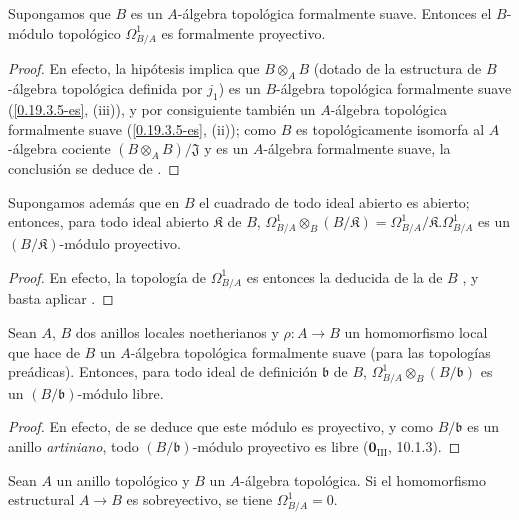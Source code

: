 \begin{theorem}[20.4.9]
\label{0.20.4.9-fr}
Supongamos que $B$ es un $A$-álgebra topológica formalmente suave. Entonces
el $B$-módulo topológico $\Omega^1_{B/A}$ es formalmente proyectivo.
\end{theorem}

\begin{proof}
En efecto, la hipótesis implica que $B\otimes_A B$ (dotado de la estructura de
$B$-álgebra topológica definida por $j_1$) es un $B$-álgebra topológica
formalmente suave (\ref{0.19.3.5-es}, (iii)), y por consiguiente también un
$A$-álgebra topológica formalmente suave (\ref{0.19.3.5-es}, (ii)); como
$B$ es topológicamente isomorfa al $A$-álgebra cociente
$(B\otimes_A B)/\mathfrak{J}$ y es un $A$-álgebra formalmente suave, la
conclusión se deduce de .
\end{proof}

\begin{corollary}[20.4.10]
\label{0.20.4.10-fr}
Supongamos además que en $B$ el cuadrado de todo ideal abierto es abierto;
entonces, para todo ideal abierto $\mathfrak{K}$ de $B$,
$\Omega^1_{B/A}\otimes_B(B/\mathfrak{K})
=\Omega^1_{B/A}/\mathfrak{K}.\Omega^1_{B/A}$ es un
$(B/\mathfrak{K})$-módulo proyectivo.
\end{corollary}

\begin{proof}
En efecto, la topología de $\Omega^1_{B/A}$ es entonces la deducida de la de
$B$ , y basta aplicar .
\end{proof}

\begin{corollary}[20.4.11]
\label{0.20.4.11-fr}
Sean $A$, $B$ dos anillos locales noetherianos y $\rho:A\to B$ un
homomorfismo local que hace de $B$ un $A$-álgebra topológica formalmente
suave (para las topologías preádicas). Entonces, para todo ideal de definición
$\mathfrak{b}$ de $B$,
$\Omega^1_{B/A}\otimes_B(B/\mathfrak{b})$ es un
$(B/\mathfrak{b})$-módulo libre.
\end{corollary}

\begin{proof}
En efecto, de  se deduce que este módulo es proyectivo, y
como $B/\mathfrak{b}$ es un anillo \emph{artiniano}, todo
$(B/\mathfrak{b})$-módulo proyectivo es libre
($\mathbf{0}_{\mathrm{III}}$, 10.1.3).
\end{proof}

\begin{proposition}[20.4.12]
\label{0.20.4.12-fr}
Sean $A$ un anillo topológico y $B$ un $A$-álgebra topológica. Si
el homomorfismo estructural $A\to B$ es sobreyectivo, se tiene
$\Omega^1_{B/A}=0$.
\end{proposition}

